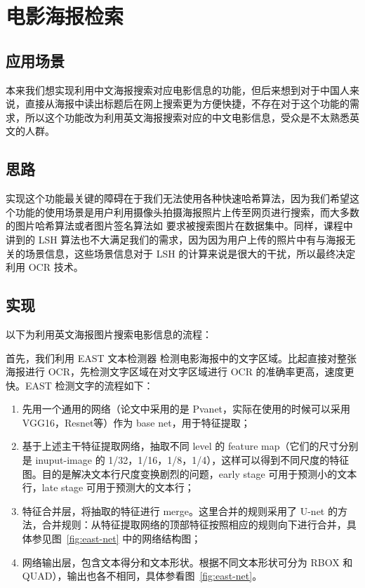 \documentclass[main.tex]{subfiles}
\begin{document}
\section{电影海报检索}

\subsection{应用场景}

本来我们想实现利用中文海报搜索对应电影信息的功能，但后来想到对于中国人来说，直接从海报中读出标题后在网上搜索更为方便快捷，不存在对于这个功能的需求，所以这个功能改为利用英文海报搜索对应的中文电影信息，受众是不太熟悉英文的人群。

\subsection{思路}

实现这个功能最关键的障碍在于我们无法使用各种快速哈希算法，因为我们希望这个功能的使用场景是用户利用摄像头拍摄海报照片上传至网页进行搜索，而大多数的图片哈希算法或者图片签名算法如 \cite{wong2002image} 要求被搜索图片在数据集中。同样，课程中讲到的 LSH 算法也不大满足我们的需求，因为因为用户上传的照片中有与海报无关的场景信息，这些场景信息对于 LSH 的计算来说是很大的干扰，所以最终决定利用 OCR 技术。

\subsection{实现}

以下为利用英文海报图片搜索电影信息的流程：

首先，我们利用 EAST 文本检测器 \cite{zhou2017east} 检测电影海报中的文字区域。比起直接对整张海报进行 OCR，先检测文字区域在对文字区域进行 OCR 的准确率更高，速度更快。EAST 检测文字的流程如下：

\begin{enumerate}
    \item 先用一个通用的网络（论文中采用的是 Pvanet，实际在使用的时候可以采用 VGG16，Resnet等）作为 base net，用于特征提取；
    \item 基于上述主干特征提取网络，抽取不同 level 的 feature map（它们的尺寸分别是 inuput-image 的 1/32，1/16，1/8，1/4），这样可以得到不同尺度的特征图。目的是解决文本行尺度变换剧烈的问题，early stage 可用于预测小的文本行，late stage 可用于预测大的文本行；
    \item 特征合并层，将抽取的特征进行 merge。这里合并的规则采用了 U-net 的方法，合并规则：从特征提取网络的顶部特征按照相应的规则向下进行合并，具体参见图~\ref{fig:east-net} 中的网络结构图；
    \item 网络输出层，包含文本得分和文本形状。根据不同文本形状可分为 RBOX 和 QUAD），输出也各不相同，具体参看图~\ref{fig:east-net}。
\end{enumerate}
\end{document}
